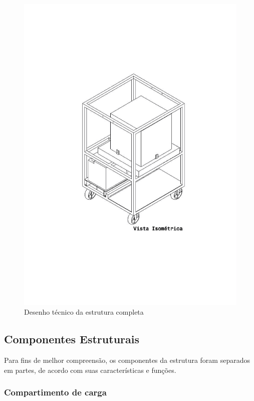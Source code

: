 \begin{figure}[H]
\centering
\includegraphics[width=16cm]{figuras/desenhomontagem.png}
\caption{Desenho técnico da estrutura completa}
\end{figure}

\subsection{Componentes Estruturais}

Para fins de melhor compreensão, os componentes da estrutura foram separados em partes, de acordo com suas características e funções.

\subsubsection{Compartimento de carga}

